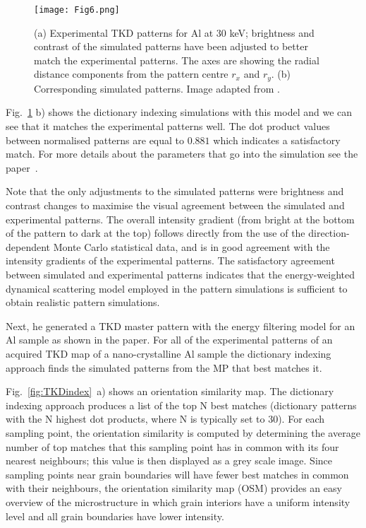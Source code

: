 \begin{figure}[ht]
\centering
\texttt{[image: Fig6.png]}
\caption[Experimental TKD patterns.]{(a) Experimental TKD patterns for Al at $30$ keV; brightness and contrast of the simulated patterns have been adjusted to better match the experimental patterns. The axes are showing the radial distance components from the pattern centre $r_x$ and $r_y$. (b) Corresponding simulated patterns. Image adapted from \cite{PascalTKD}. }
\label{fig:TKDpatternfit}
\end{figure}

Fig.~\ref{fig:TKDpatternfit} b) shows the dictionary indexing simulations with this model and we can see that it matches the experimental patterns well. The dot product values between normalised patterns are equal to $0.881$ which indicates a satisfactory match. For more details about the parameters that go into the simulation see the paper~\cite{PascalTKD}.

Note that the only adjustments to the simulated patterns were brightness and contrast changes to maximise the visual agreement between the simulated and experimental patterns.  The overall intensity gradient (from bright at the bottom of the pattern to dark at the top) follows directly from the use of the direction-dependent Monte Carlo statistical data, and is in good agreement with the intensity gradients of the experimental patterns.  The satisfactory agreement between simulated and experimental patterns indicates that the energy-weighted dynamical scattering model employed in the pattern simulations is sufficient to obtain realistic pattern simulations. 

Next, he generated a TKD master pattern with the energy filtering model for an Al sample as shown in the paper. For all of the experimental patterns  of an acquired TKD map of a nano-crystalline Al sample  the dictionary indexing approach finds the simulated patterns from the MP that best matches it. 

Fig.~\ref{fig:TKDindex}~a) shows an orientation similarity map. The dictionary indexing approach produces a list of the top N best matches (dictionary patterns with the N highest dot products, where N is typically set to 30). For each sampling point, the orientation similarity is computed by determining the average number of top matches that this sampling point has in common with its four nearest neighbours; this value is then displayed as a grey scale image. Since sampling points near grain boundaries will have fewer best matches in common with their neighbours, the orientation similarity map (OSM) provides an easy overview of the microstructure in which grain interiors have a uniform intensity level and all grain boundaries have lower intensity.

